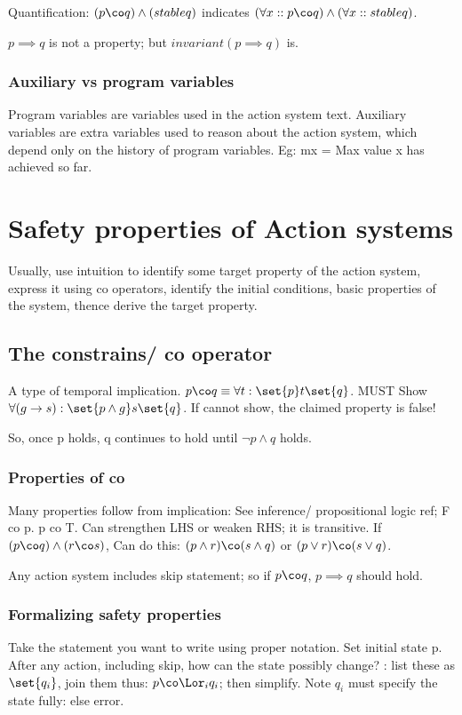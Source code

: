 \documentclass[oneside, article]{memoir}
\begin{document}
Quantification: $(p \co q) \land (stable q)$ indicates $(\forall x:: p \co q) \land (\forall x:: stable q)$.

$p \implies q$ is not a property; but $invariant(p \implies q)$ is.

\subsubsection{Auxiliary vs program variables}
Program variables are variables used in the action system text. Auxiliary variables are extra variables used to reason about the action system, which depend only on the history of program variables. Eg: mx = Max value x has achieved so far.

\section{Safety properties of Action systems}
Usually, use intuition to identify some target property of the action system, express it using co operators, identify the initial conditions, basic properties of the system, thence derive the target property.

\subsection{The constrains/ co operator}
A type of temporal implication. $p \co q \equiv \forall t: \set{p} t \set{q}$. MUST Show $\forall (g \to s) : \set{p \land g} s \set{q}$. If cannot show, the claimed property is false!

So, once p holds, q continues to hold until $\lnot p \land q$ holds.

\subsubsection{Properties of co}
Many properties follow from implication: See inference/ propositional logic ref; F co p. p co T. Can strengthen LHS or weaken RHS; it is transitive. If $(p \co q) \land (r \co s)$, Can do this: $(p \land r) \co (s \land q)$ or $(p \lor r) \co (s \lor q)$.

Any action system includes skip statement; so if $p \co q$, $p \implies q$ should hold.

\subsubsection{Formalizing safety properties}
Take the statement you want to write using proper notation. Set initial state p. After any action, including skip, how can the state possibly change? : list these as $\set{q_i}$, join them thus: $p \co \Lor_i q_i$; then simplify. Note $q_i$ must specify the state fully: else error.
\end{document}
